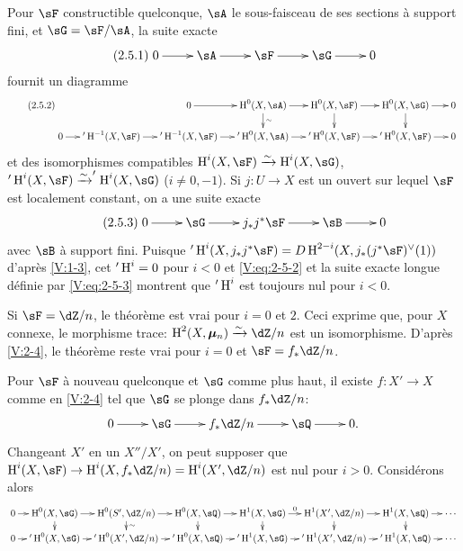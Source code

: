 Pour $\sF$ constructible quelconque, $\sA$ le sous-faisceau de ses sections à 
support fini, et $\sG=\sF/\sA$, la suite exacte 
\begin{equation*}\label{V:eq:2-5-1}\tag{2.5.1}
\xymatrix{
  0 \ar[r] 
    & \sA \ar[r] 
    & \sF \ar[r] 
    & \sG \ar[r] 
    & 0 
}
\end{equation*}
fournit un diagramme 
\begin{equation*}\tag{2.5.2}\label{V:eq:2-5-2}
\xymatrix@=.5cm{
  & & 0 \ar[r] 
    & \h^0(X,\sA) \ar[r] \ar[d]^-\sim 
    & \h^0(X,\sF) \ar[r] \ar[d] 
    & \h^0(X,\sG) \ar[r] \ar[d] 
    & 0 \\
  0 \ar[r] 
  & '\h^{-1}(X,\sF) \ar[r] 
  & '\h^{-1}(X,\sF) \ar[r] 
  & '\h^0(X,\sA) \ar[r] 
  & '\h^0(X,\sF) \ar[r] 
  & '\h^0(X,\sF) \ar[r] 
  & 0 
}
\end{equation*}
et des isomorphismes compatibles $\h^i(X,\sF)\iso \h^i(X,\sG)$, 
$'\h^i(X,\sF) \iso '\h^i(X,\sG)$ ($i\ne 0,-1$). Si $j:U\to X$ est un ouvert sur 
lequel $\sF$ est localement constant, on a une suite exacte 
\begin{equation*}\tag{2.5.3}\label{V:eq:2-5-3}
\xymatrix{
  0 \ar[r] 
    & \sG \ar[r] 
    & j_\ast j^\ast \sF \ar[r] 
    & \sB \ar[r] 
    & 0
}
\end{equation*}
avec $\sB$ à support fini. Puisque 
$'\h^i(X,j_\ast j^\ast\sF) = D \h^{2-i} (X,j_\ast(j^\ast\sF)^\vee(1))$ 
d'après \ref{V:1-3}, cet $'\operatorname{H}^i=0$ pour $i<0$ et \eqref{V:eq:2-5-2} et la 
suite exacte longue définie par \eqref{V:eq:2-5-3} montrent que $'\operatorname{H}^i$ est 
toujours nul pour $i<0$. 

Si $\sF=\dZ/n$, le théorème est vrai pour $i=0$ et $2$. Ceci exprime que, 
pour $X$ connexe, le morphisme trace: $\h^2(X,\dmu_n) \iso \dZ/n$ est un 
isomorphisme. D'après \ref{V:2-4}, le théorème reste vrai pour $i=0$ et 
$\sF=f_\ast\dZ/n$. 

Pour $\sF$ à nouveau quelconque et $\sG$ comme plus haut, il existe 
$f:X'\to X$ comme en \ref{V:2-4} tel que $\sG$ se plonge dans $f_\ast\dZ/n$:
\[\xymatrix{
  0 \ar[r] 
    & \sG \ar[r] 
    & f_\ast\dZ/n \ar[r] 
    & \sQ \ar[r] 
    & 0 \text{.}
}\]
Changeant $X'$ en un $X''/X'$, on peut supposer que 
$\h^i(X,\sF) \to \h^i(X,f_\ast\dZ/n) = \h^i(X',\dZ/n)$ est nul pour $i>0$. 
Considérons alors 
\[\xymatrix@=.3cm{
  0 \ar[r] 
    & \h^0(X,\sG) \ar[r] \ar[d] 
    & \h^0(S',\dZ/n) \ar[r] \ar[d]^-\sim 
    & \h^0(X,\sQ) \ar[r] \ar[d] 
    & \h^1(X,\sG) \ar[r]^-0 \ar[d] 
    & \h^1(X',\dZ/n) \ar[r] \ar[d] 
    & \h^1(X,\sQ) \ar[r] \ar[d] 
    & \cdots \\
  0 \ar[r] 
    & '\h^0(X,\sG) \ar[r] 
    & '\h^0(X',\dZ/n) \ar[r] 
    & '\h^0(X,\sQ) \ar[r] 
    & '\h^1(X,\sG) \ar[r] 
    & '\h^1(X',\dZ/n) \ar[r] 
    & '\h^1(X,\sQ) \ar[r] 
    & \cdots
}\]

